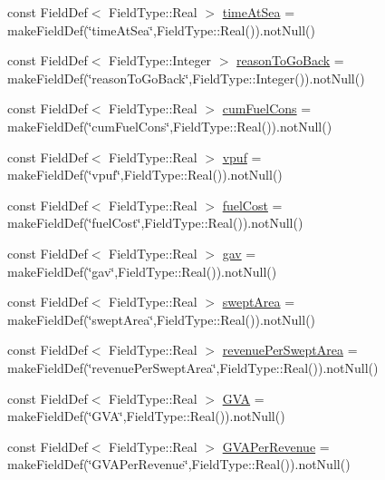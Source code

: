 \begin{DoxyCompactItemize}
\item 
const Field\+Def$<$ Field\+Type\+::\+Real $>$ \mbox{\hyperlink{class_vessels_loglike_table_ae663140fea116a90635dacdfd7231a94}{time\+At\+Sea}} = make\+Field\+Def(\char`\"{}time\+At\+Sea\char`\"{},Field\+Type\+::\+Real()).not\+Null()
\item 
const Field\+Def$<$ Field\+Type\+::\+Integer $>$ \mbox{\hyperlink{class_vessels_loglike_table_aaa70ecce636b8a63366ed4c21a946212}{reason\+To\+Go\+Back}} = make\+Field\+Def(\char`\"{}reason\+To\+Go\+Back\char`\"{},Field\+Type\+::\+Integer()).not\+Null()
\item 
const Field\+Def$<$ Field\+Type\+::\+Real $>$ \mbox{\hyperlink{class_vessels_loglike_table_a735694ec1f64a2f3a67e6a72e7d709ad}{cum\+Fuel\+Cons}} = make\+Field\+Def(\char`\"{}cum\+Fuel\+Cons\char`\"{},Field\+Type\+::\+Real()).not\+Null()
\item 
const Field\+Def$<$ Field\+Type\+::\+Real $>$ \mbox{\hyperlink{class_vessels_loglike_table_a48a1f37966234c07e77dc53e2155a087}{vpuf}} = make\+Field\+Def(\char`\"{}vpuf\char`\"{},Field\+Type\+::\+Real()).not\+Null()
\item 
const Field\+Def$<$ Field\+Type\+::\+Real $>$ \mbox{\hyperlink{class_vessels_loglike_table_a70b993e77dccb9480b878202103740e3}{fuel\+Cost}} = make\+Field\+Def(\char`\"{}fuel\+Cost\char`\"{},Field\+Type\+::\+Real()).not\+Null()
\item 
const Field\+Def$<$ Field\+Type\+::\+Real $>$ \mbox{\hyperlink{class_vessels_loglike_table_a0803c6234d3c63dac832d2fb96c6af4e}{gav}} = make\+Field\+Def(\char`\"{}gav\char`\"{},Field\+Type\+::\+Real()).not\+Null()
\item 
const Field\+Def$<$ Field\+Type\+::\+Real $>$ \mbox{\hyperlink{class_vessels_loglike_table_a9bbfe4e61fff420c054851ebeb3e1182}{swept\+Area}} = make\+Field\+Def(\char`\"{}swept\+Area\char`\"{},Field\+Type\+::\+Real()).not\+Null()
\item 
const Field\+Def$<$ Field\+Type\+::\+Real $>$ \mbox{\hyperlink{class_vessels_loglike_table_a6d22995de3771d9d569ff29b4d759e41}{revenue\+Per\+Swept\+Area}} = make\+Field\+Def(\char`\"{}revenue\+Per\+Swept\+Area\char`\"{},Field\+Type\+::\+Real()).not\+Null()
\item 
const Field\+Def$<$ Field\+Type\+::\+Real $>$ \mbox{\hyperlink{class_vessels_loglike_table_a0ef23c6b18943a3659dc7efb19c307ff}{G\+VA}} = make\+Field\+Def(\char`\"{}G\+VA\char`\"{},Field\+Type\+::\+Real()).not\+Null()
\item 
const Field\+Def$<$ Field\+Type\+::\+Real $>$ \mbox{\hyperlink{class_vessels_loglike_table_a28f91f0e4042d71e1bf5fb2d1929d07c}{G\+V\+A\+Per\+Revenue}} = make\+Field\+Def(\char`\"{}G\+V\+A\+Per\+Revenue\char`\"{},Field\+Type\+::\+Real()).not\+Null()

\end{DoxyCompactItemize}
